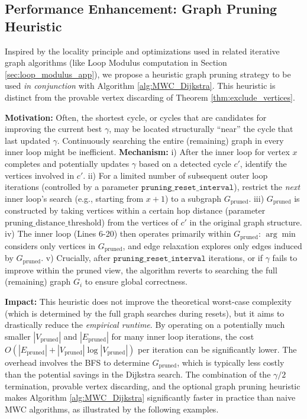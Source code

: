 \documentclass{article}
\begin{document}
\subsection{Performance Enhancement: Graph Pruning Heuristic}
\label{subsec:pruning_heuristic_complexity} %

Inspired by the locality principle and optimizations used in related iterative graph algorithms (like Loop Modulus computation in Section \ref{sec:loop_modulus_app}), we propose a heuristic graph pruning strategy to be used \textit{in conjunction} with Algorithm \ref{alg:MWC_Dijkstra}. This heuristic is distinct from the provable vertex discarding of Theorem \ref{thm:exclude_vertices}.

\textbf{Motivation:} Often, the shortest cycle, or cycles that are candidates for improving the current best $\gamma$, may be located structurally ``near'' the cycle that last updated $\gamma$. Continuously searching the entire (remaining) graph in every inner loop might be inefficient.
\textbf{Mechanism:} i) After the inner loop for vertex $x$ completes and potentially updates $\gamma$ based on a detected cycle $c'$, identify the vertices involved in $c'$. ii) For a limited number of subsequent outer loop iterations (controlled by a parameter $\texttt{pruning\_reset\_interval}$), restrict the \textit{next} inner loop's search (e.g., starting from $x+1$) to a subgraph $G_{\text{pruned}}$. iii) $G_{\text{pruned}}$ is constructed by taking vertices within a certain hop distance (parameter $\text{pruning\_distance\_threshold}$) from the vertices of $c'$ in the original graph structure. iv) The inner loop (Lines 6-20) then operates primarily within $G_{\text{pruned}}$: $\arg\min$ considers only vertices in $G_{\text{pruned}}$, and edge relaxation explores only edges induced by $G_{\text{pruned}}$. v) Crucially, after $\texttt{pruning\_reset\_interval}$ iterations, or if $\gamma$ fails to improve within the pruned view, the algorithm reverts to searching the full (remaining) graph $G_i$ to ensure global correctness.

\textbf{Impact:} This heuristic does not improve the theoretical worst-case complexity (which is determined by the full graph searches during resets), but it aims to drastically reduce the \textit{empirical runtime}. By operating on a potentially much smaller $|V_{\text{pruned}}|$ and $|E_{\text{pruned}}|$ for many inner loop iterations, the cost $O(|E_{\text{pruned}}| + |V_{\text{pruned}}|\log |V_{\text{pruned}}|)$ per iteration can be significantly lower. The overhead involves the BFS to determine $G_{\text{pruned}}$, which is typically less costly than the potential savings in the Dijkstra search.
The combination of the $\gamma/2$ termination, provable vertex discarding, and the optional graph pruning heuristic makes Algorithm \ref{alg:MWC_Dijkstra} significantly faster in practice than naive MWC algorithms, as illustrated by the following examples.
\end{document}
